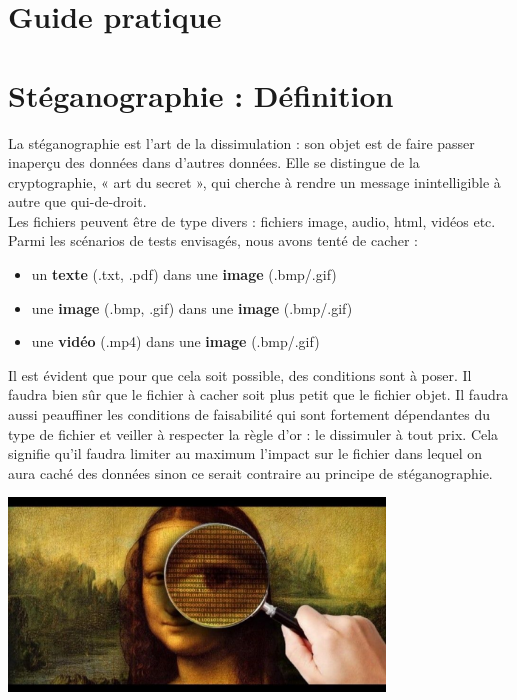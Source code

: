 \vspace{1.5cm}
\section{Guide pratique}


\newpage
\section{Stéganographie : Définition}
La stéganographie est l'art de la dissimulation : son objet est de faire passer inaperçu des données dans d'autres données. 
Elle se distingue de la cryptographie, « art du secret », qui cherche à rendre un message inintelligible à autre que qui-de-droit.\\
Les fichiers peuvent être de type divers : fichiers image, audio, html, vidéos etc.\\
Parmi les scénarios de tests envisagés, nous avons tenté de cacher :\\

\begin{itemize}[label=$\diamond$, font=\LARGE \color{black}]
    \item un \textbf{texte} (.txt, .pdf) dans une \textbf{image} (.bmp/.gif)
    \item une \textbf{image} (.bmp, .gif) dans une \textbf{image} (.bmp/.gif)
    \item une \textbf{vidéo} (.mp4) dans une \textbf{image} (.bmp/.gif)\\
\end{itemize}

Il est évident que pour que cela soit possible, des conditions sont à poser.
Il faudra bien sûr que le fichier à cacher soit plus petit que le fichier objet. Il faudra aussi peauffiner les conditions de 
faisabilité qui sont fortement dépendantes du type de fichier et veiller à respecter la règle d'or : le dissimuler à tout prix.
Cela signifie qu'il faudra limiter au maximum l'impact sur le fichier dans lequel on aura caché des données sinon ce serait contraire
au principe de stéganographie.

\vspace{1.5cm}
\begin{center}
    \includegraphics[width=10cm]{steganographie.eps}
\end{center}

